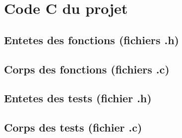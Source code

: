 \section{Code C du projet}

  \subsection{Entetes des fonctions (fichiers .h)}
  

  \subsection{Corps des fonctions (fichiers .c)}
  

  \subsection{Entetes des tests (fichier .h)}
  

  \subsection{Corps des tests (fichier .c)}
  
